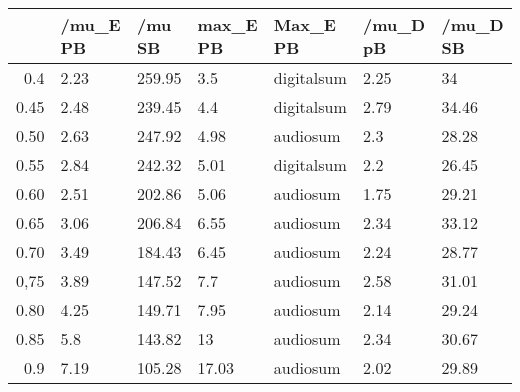 \begin{table}[ht]
\centering
\begin{tabular}{rllllll}
  \hline
 & /mu\_E PB & /mu SB & max\_E PB & Max\_E PB & /mu\_D pB & /mu\_D SB \\ 
  \hline
0.4 & 2.23 & 259.95 & 3.5 & digitalsum & 2.25 & 34 \\ 
  0.45 & 2.48 & 239.45 & 4.4 & digitalsum & 2.79 & 34.46 \\ 
  0.50 & 2.63 & 247.92 & 4.98 & audiosum & 2.3 & 28.28 \\ 
  0.55 & 2.84 & 242.32 & 5.01 & digitalsum & 2.2 & 26.45 \\ 
  0.60 & 2.51 & 202.86 & 5.06 & audiosum & 1.75 & 29.21 \\ 
  0.65 & 3.06 & 206.84 & 6.55 & audiosum & 2.34 & 33.12 \\ 
  0.70 & 3.49 & 184.43 & 6.45 & audiosum & 2.24 & 28.77 \\ 
  0,75 & 3.89 & 147.52 & 7.7 & audiosum & 2.58 & 31.01 \\ 
  0.80 & 4.25 & 149.71 & 7.95 & audiosum & 2.14 & 29.24 \\ 
  0.85 & 5.8 & 143.82 & 13 & audiosum & 2.34 & 30.67 \\ 
  0.9 & 7.19 & 105.28 & 17.03 & audiosum & 2.02 & 29.89 \\ 
   \hline
\end{tabular}
\end{table}
